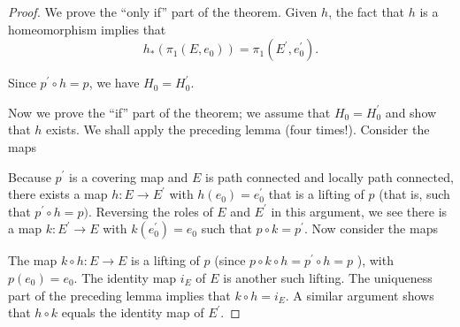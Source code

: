 \begin{proof}
	We prove the ``only if'' part of the theorem. Given \(h\), the fact that \(h\) is a homeomorphism implies that
\[
h_{ * }( {{\pi }_{1}( {E,e_{0}}) }) = {\pi }_{1}( {E^{\prime },e_0^{\prime }}).
\]

Since \(p^{\prime } \circ h = p\), we have \(H_{0} = H_0^{\prime }\).

Now we prove the ``if'' part of the theorem; we assume that \(H_{0} = H_0^{\prime }\) and show that \(h\) exists. We shall apply the preceding lemma (four times!). Consider the maps

\par\nopagebreak
\begin{center}
	\label{fig:com_79_2_a}
\end{center}
\par\nopagebreak 

Because \(p^{\prime }\) is a covering map and \(E\) is path connected and locally path connected, there exists a map \(h : E \rightarrow {E}^{\prime }\) with \(h( e_{0}) = e_0^{\prime }\) that is a lifting of \(p\) (that is, such that \(p^{\prime } \circ h = p)\). Reversing the roles of \(E\) and \(E^{\prime }\) in this argument, we see there is a map \(k : E^{\prime } \rightarrow E\) with \(k( e_0^{\prime }) = e_{0}\) such that \(p \circ k = p^{\prime }\). Now consider the maps

\par\nopagebreak
\begin{center}
	\label{fig:com_79_2_b}
\end{center}
\par\nopagebreak

The map \(k \circ h : E \rightarrow E\) is a lifting of \(p\) (since \(p \circ k \circ h = p^{\prime } \circ h = p\) ), with \(p( e_{0}) = e_{0}\). The identity map \(i_{E}\) of \(E\) is another such lifting. The uniqueness part of the preceding lemma implies that \(k \circ h = i_{E}\). A similar argument shows that \(h \circ k\) equals the identity map of \(E^{\prime }\). 


\end{proof}
